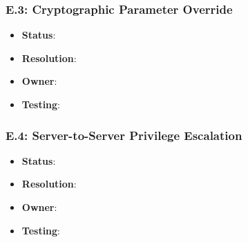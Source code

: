 \documentclass[../veristore_security_model.tex]{subfiles}
\begin{document}
\subsubsection{E.3: Cryptographic Parameter Override}
\begin{itemize}
\item \textbf{Status}: %
\item \textbf{Resolution}: %
\item \textbf{Owner}: %
\item \textbf{Testing}: %
\end{itemize}

\subsubsection{E.4: Server-to-Server Privilege Escalation}
\begin{itemize}
\item \textbf{Status}: %
\item \textbf{Resolution}: %
\item \textbf{Owner}: %
\item \textbf{Testing}: %
\end{itemize}

\newpage
\end{document}

